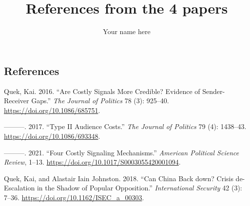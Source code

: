\documentclass{article}
\title{References from the 4 papers}
\author{Your name here}
\begin{document}
\maketitle

\begin{hangparas}{.25in}{1}

\section*{References}
Quek, Kai. 2016. {``Are Costly Signals More Credible? Evidence of Sender-Receiver Gaps.''} \textit{The Journal of Politics} 78 (3): 925--40. \url{https://doi.org/10.1086/685751}.

---------. 2017. {``Type II Audience Costs.''} \textit{The Journal of Politics} 79 (4): 1438--43. \url{https://doi.org/10.1086/693348}.

---------. 2021. {``Four Costly Signaling Mechanisms.''} \textit{American Political Science Review}, 1--13. \url{https://doi.org/10.1017/S0003055420001094}.

Quek, Kai, and Alastair Iain Johnston. 2018. {``Can China Back down? Crisis de-Escalation in the Shadow of Popular Opposition.''} \textit{International Security} 42 (3): 7--36. \url{https://doi.org/10.1162/ISEC_a_00303}.

\end{hangparas}
\end{document}
